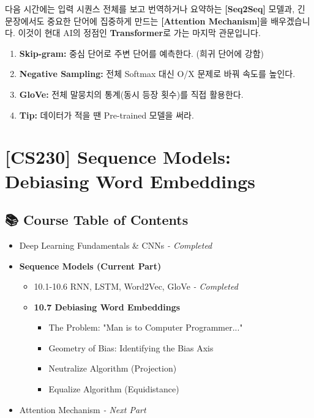\documentclass[11pt,a4paper]{book}
\theoremstyle{definition}
\begin{document}
다음 시간에는 입력 시퀀스 전체를 보고 번역하거나 요약하는 \textbf{[Seq2Seq]} 모델과, 긴 문장에서도 중요한 단어에 집중하게 만드는 \textbf{[Attention Mechanism]}을 배우겠습니다. 이것이 현대 AI의 정점인 \textbf{Transformer}로 가는 마지막 관문입니다.

\vspace{0.5cm}

\begin{summarybox}[title={단원 요약 (Cheat Sheet)}]
\begin{enumerate}
    \item \textbf{Skip-gram:} 중심 단어로 주변 단어를 예측한다. (희귀 단어에 강함)
    \item \textbf{Negative Sampling:} 전체 Softmax 대신 O/X 문제로 바꿔 속도를 높인다.
    \item \textbf{GloVe:} 전체 말뭉치의 통계(동시 등장 횟수)를 직접 활용한다.
    \item \textbf{Tip:} 데이터가 적을 땐 Pre-trained 모델을 써라.
\end{enumerate}
\end{summarybox}


\chapter{[CS230] Sequence Models: \\ Debiasing Word Embeddings}
\label{ch:lecture45}

\section*{📚 Course Table of Contents}
\begin{itemize}
    \item[Chapter 1-9.] Deep Learning Fundamentals \& CNNs \textit{- Completed}
    \item[\textbf{Chapter 10.}] \textbf{Sequence Models (Current Part)}
    \begin{itemize}
        \item 10.1-10.6 RNN, LSTM, Word2Vec, GloVe \textit{- Completed}
        \item \textbf{10.7 Debiasing Word Embeddings}
        \begin{itemize}
            \item The Problem: "Man is to Computer Programmer..."
            \item Geometry of Bias: Identifying the Bias Axis
            \item Neutralize Algorithm (Projection)
            \item Equalize Algorithm (Equidistance)
        \end{itemize}
    \end{itemize}
    \item[Chapter 11.] Attention Mechanism \textit{- Next Part}
\end{itemize}
\end{document}
